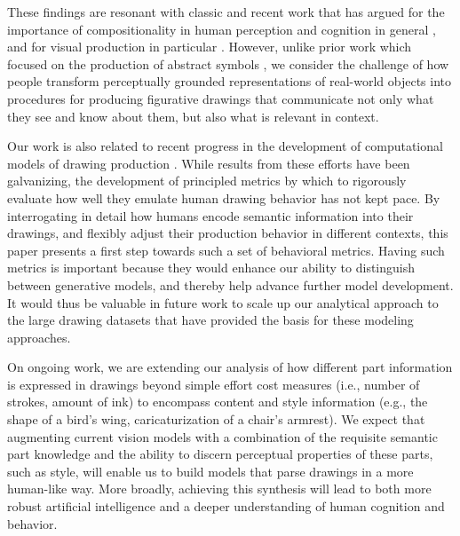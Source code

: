 \documentclass[10pt,letterpaper]{article}
\begin{document}
These findings are resonant with classic and recent work that has argued for the importance of compositionality in human perception and cognition in general \cite{biederman1987recognition, battaglia2018relational,lake2017building}, and for visual production in particular \cite{lake2015human}. 
However, unlike prior work which focused on the production of abstract symbols \cite{lake2015human}, we consider the challenge of how people transform perceptually grounded representations of real-world objects into procedures for producing figurative drawings that communicate not only what they see and know about them, but also what is relevant in context. 

Our work is also related to recent progress in the development of computational models of drawing production \cite{ha2017neural,li2019photo}. 
While results from these efforts have been galvanizing, the development of principled metrics by which to rigorously evaluate how well they emulate human drawing behavior has not kept pace. 
By interrogating in detail how humans encode semantic information into their drawings, and flexibly adjust their production behavior in different contexts, this paper presents a first step towards such a set of behavioral metrics. 
Having such metrics is important because they would enhance our ability to distinguish between generative models, and thereby help advance further model development. 
It would thus be valuable in future work to scale up our analytical approach to the large drawing datasets \cite{eitz2012humans,sangkloy2016sketchy,quickdraw2017} that have provided the basis for these modeling approaches.

On ongoing work, we are extending our analysis of how different part information is expressed in drawings beyond simple effort cost measures (i.e., number of strokes, amount of ink) to encompass content and style information (e.g., the shape of a bird's wing, caricaturization of a chair's armrest). 
We expect that augmenting current vision models with a combination of the requisite semantic part knowledge and the ability to discern perceptual properties of these parts, such as style, will enable us to build models that parse drawings in a more human-like way.
More broadly, achieving this synthesis will lead to both more robust artificial intelligence and a deeper understanding of human cognition and behavior. 
\end{document}
